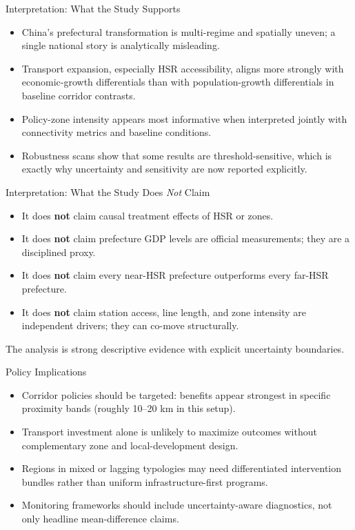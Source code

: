 \documentclass[aspectratio=169]{beamer}
\begin{document}
\begin{frame}{Interpretation: What the Study Supports}
\small
\begin{itemize}
  \item China's prefectural transformation is multi-regime and spatially uneven; a single national story is analytically misleading.
  \item Transport expansion, especially HSR accessibility, aligns more strongly with economic-growth differentials than with population-growth differentials in baseline corridor contrasts.
  \item Policy-zone intensity appears most informative when interpreted jointly with connectivity metrics and baseline conditions.
  \item Robustness scans show that some results are threshold-sensitive, which is exactly why uncertainty and sensitivity are now reported explicitly.
\end{itemize}
\end{frame}

\begin{frame}{Interpretation: What the Study Does \emph{Not} Claim}
\small
\begin{itemize}
  \item It does \textbf{not} claim causal treatment effects of HSR or zones.
  \item It does \textbf{not} claim prefecture GDP levels are official measurements; they are a disciplined proxy.
  \item It does \textbf{not} claim every near-HSR prefecture outperforms every far-HSR prefecture.
  \item It does \textbf{not} claim station access, line length, and zone intensity are independent drivers; they can co-move structurally.
\end{itemize}
\vspace{0.3em}
The analysis is strong descriptive evidence with explicit uncertainty boundaries.
\end{frame}

\begin{frame}{Policy Implications}
\small
\begin{itemize}
  \item Corridor policies should be targeted: benefits appear strongest in specific proximity bands (roughly 10--20 km in this setup).
  \item Transport investment alone is unlikely to maximize outcomes without complementary zone and local-development design.
  \item Regions in mixed or lagging typologies may need differentiated intervention bundles rather than uniform infrastructure-first programs.
  \item Monitoring frameworks should include uncertainty-aware diagnostics, not only headline mean-difference claims.
\end{itemize}
\end{frame}
\end{document}
